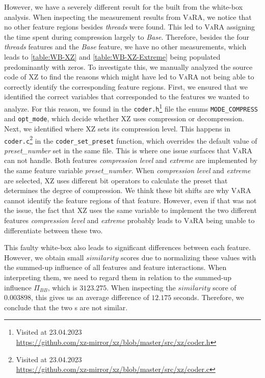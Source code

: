 However, we have a severely different result for the {\perfInfluenceModel} built from the white-box analysis. 
When inspecting the measurement results from \textsc{VaRA}, we notice that no other feature regions besides \emph{threads} were found. 
This led to \textsc{VaRA} assigning the time spent during compression largely to \emph{Base}. 
Therefore, besides the four \emph{threads} features and the \emph{Base} feature, we have no other measurements,  
which leads to \autoref{table:WB-XZ} and \autoref{table:WB-XZ-Extreme} being populated predominantly with zeros.
To investigate this, we manually analyzed the source code of \textsc{XZ} to find the reasons which might have led to 
\textsc{VaRA} not being able to correctly identify the corresponding feature regions.
First, we ensured that we identified the correct variables that corresponded to the features we wanted to analyze. 
For this reason, we found in the \texttt{coder.h}\footnote{Visited at 23.04.2023\\ \url{https://github.com/xz-mirror/xz/blob/master/src/xz/coder.h}}
file the enums \texttt{MODE\_COMPRESS} and \texttt{opt\_mode}, which decide whether \textsc{XZ} uses compression or decompression. 
%
Next, we identified where \textsc{XZ} sets its compression level. 
This happens in \texttt{coder.c}\footnote{Visited at 23.04.2023\\ \url{https://github.com/xz-mirror/xz/blob/master/src/xz/coder.c}} 
in the \texttt{coder\_set\_preset} function, which overrides the default value of \emph{preset\_number} set in the same file. 
This is where one issue surfaces that \textsc{VaRA} can not handle. 
Both features \emph{compression level} and \emph{extreme} are implemented by the same feature variable \emph{preset\_number}. 
When \emph{compression level} and \emph{extreme} are selected, \textsc{XZ} uses different bit operators to calculate the preset that determines 
the degree of compression. We think these bit shifts are why \textsc{VaRA} cannot identify the feature regions of that feature. 
However, even if that was not the issue, the fact that \textsc{XZ} uses the same variable to implement the two different features 
\emph{compression level} and \emph{extreme} probably leads to \textsc{VaRA} being unable to differentiate between these two.

This faulty white-box {\perfInfluenceModel} also leads to significant differences between each feature. 
However, we obtain small $similarity$ scores due to normalizing these values with the summed-up influence of all features and feature interactions. 
When interpreting them, we need to regard them in relation to the summed-up influence $\Pi_{BB}$, which is $3123.275$. 
When inspecting the $\overline{similarity}$ score of $0.003898$, this gives us an average difference of $12.175$ seconds. 
Therefore, we conclude that the two {\perfInfluenceModel}s are not similar.

